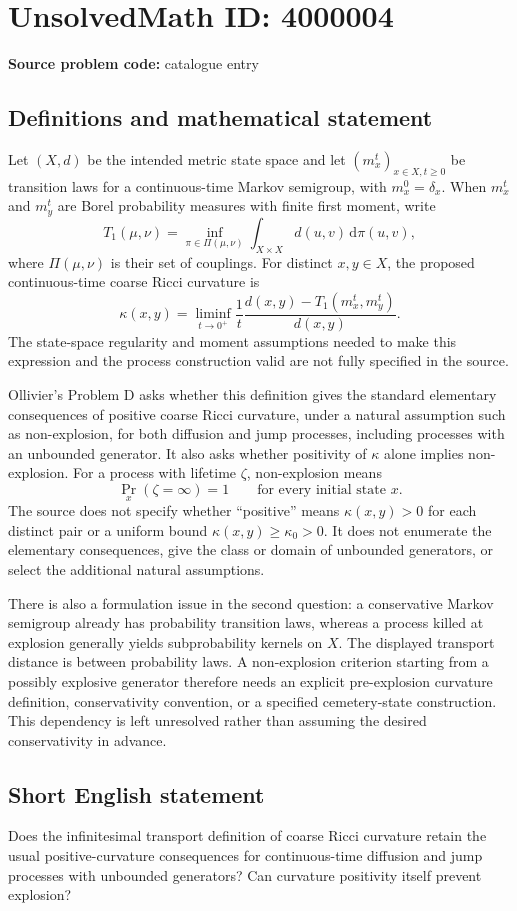 \documentclass[11pt]{article}
\begin{document}
\section*{UnsolvedMath ID: 4000004}
\textbf{Source problem code:} catalogue entry
\subsection{Definitions and mathematical statement}
Let $(X,d)$ be the intended metric state space and let $(m_x^t)_{x\in X,t\ge0}$ be transition laws for a continuous-time Markov semigroup, with $m_x^0=\delta_x$. When $m_x^t$ and $m_y^t$ are Borel probability measures with finite first moment, write
\[
 T_1(\mu,\nu)=\inf_{\pi\in\Pi(\mu,\nu)}
             \int_{X\times X}d(u,v)\,\mathrm d\pi(u,v),
\]
where $\Pi(\mu,\nu)$ is their set of couplings. For distinct $x,y\in X$, the proposed continuous-time coarse Ricci curvature is
\[
 \kappa(x,y)=\liminf_{t\to0^+}\frac1t
   \frac{d(x,y)-T_1(m_x^t,m_y^t)}{d(x,y)}.
\]
The state-space regularity and moment assumptions needed to make this expression and the process construction valid are not fully specified in the source.

Ollivier's Problem D asks whether this definition gives the standard elementary consequences of positive coarse Ricci curvature, under a natural assumption such as non-explosion, for both diffusion and jump processes, including processes with an unbounded generator. It also asks whether positivity of $\kappa$ alone implies non-explosion. For a process with lifetime $\zeta$, non-explosion means
\[
 \Pr_x(\zeta=\infty)=1\qquad\text{for every initial state }x.
\]
The source does not specify whether ``positive'' means $\kappa(x,y)>0$ for each distinct pair or a uniform bound $\kappa(x,y)\ge\kappa_0>0$. It does not enumerate the elementary consequences, give the class or domain of unbounded generators, or select the additional natural assumptions.

There is also a formulation issue in the second question: a conservative Markov semigroup already has probability transition laws, whereas a process killed at explosion generally yields subprobability kernels on $X$. The displayed transport distance is between probability laws. A non-explosion criterion starting from a possibly explosive generator therefore needs an explicit pre-explosion curvature definition, conservativity convention, or a specified cemetery-state construction. This dependency is left unresolved rather than assuming the desired conservativity in advance.
\subsection{Short English statement}
Does the infinitesimal transport definition of coarse Ricci curvature retain the usual positive-curvature consequences for continuous-time diffusion and jump processes with unbounded generators? Can curvature positivity itself prevent explosion?
\end{document}
